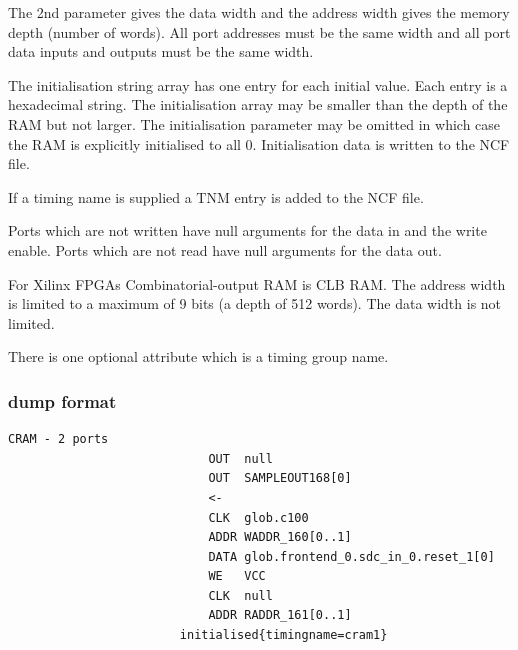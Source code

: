 \documentclass[10pt,a4paper,twoside,fleqn]{book}
\begin{document}
                    The 2nd parameter gives the data width and the address width
                    gives the memory depth (number of words). All port addresses
                    must be the same width and all port data inputs and outputs
                    must be the same width.

                    The initialisation string array has one entry for each
                    initial value. Each entry is a hexadecimal string. The
                    initialisation array may be smaller than the depth of the
                    RAM but not larger. The initialisation parameter may be
                    omitted in which case the RAM is explicitly initialised to
                    all 0. Initialisation data is written to the NCF file.
                    
                    If a timing name is supplied a TNM entry is added to the
                    NCF file.

                    Ports which are not written have null arguments for the data
                    in and the write enable. Ports which are not read have null
                    arguments for the data out.

                    For Xilinx FPGAs Combinatorial-output RAM is CLB RAM. The
                    address width is limited to a maximum of 9 bits (a depth of 512
                    words). The data width is not limited.
                    
                    There is one optional attribute which is a timing group name.

                \subsubsection{dump format}

                    \begin{lstlisting}[gobble=20, language=tde]
                        CRAM - 2 ports
                            OUT  null
                            OUT  SAMPLEOUT168[0]
                            <-
                            CLK  glob.c100
                            ADDR WADDR_160[0..1]
                            DATA glob.frontend_0.sdc_in_0.reset_1[0]
                            WE   VCC
                            CLK  null
                            ADDR RADDR_161[0..1]
                        initialised{timingname=cram1}
                    \end{lstlisting}
\end{document}
